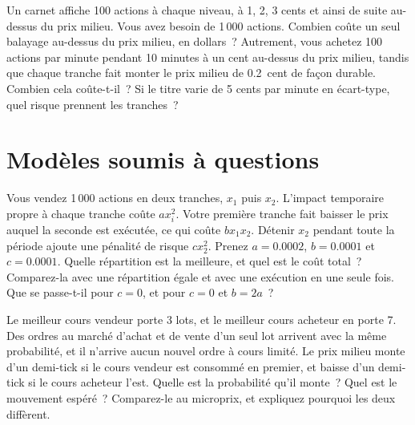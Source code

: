 \begin{question}\label{iq:iv2:markets-and-microstructure:34}
Un carnet affiche 100 actions à chaque niveau, à 1, 2, 3 cents et ainsi de suite au-dessus du prix milieu. Vous avez besoin de 1\,000 actions. Combien coûte un seul balayage au-dessus du prix milieu, en dollars~? Autrement, vous achetez 100 actions par minute pendant 10 minutes à un cent au-dessus du prix milieu, tandis que chaque tranche fait monter le prix milieu de 0.2~cent de façon durable. Combien cela coûte-t-il~? Si le titre varie de 5 cents par minute en écart-type, quel risque prennent les tranches~?
\end{question}

\section{Modèles soumis à questions}

\begin{question}\label{iq:iv2:markets-and-microstructure:35}
Vous vendez 1\,000 actions en deux tranches, $x_1$ puis $x_2$. L'impact temporaire propre à chaque tranche coûte $a x_i^2$. Votre première tranche fait baisser le prix auquel la seconde est exécutée, ce qui coûte $b x_1 x_2$. Détenir $x_2$ pendant toute la période ajoute une pénalité de risque $c x_2^2$. Prenez $a = 0.0002$, $b = 0.0001$ et $c = 0.0001$. Quelle répartition est la meilleure, et quel est le coût total~? Comparez-la avec une répartition égale et avec une exécution en une seule fois. Que se passe-t-il pour $c = 0$, et pour $c = 0$ et $b = 2a$~?
\end{question}

\begin{question}\label{iq:iv2:markets-and-microstructure:36}
Le meilleur cours vendeur porte 3 lots, et le meilleur cours acheteur en porte 7. Des ordres au marché d'achat et de vente d'un seul lot arrivent avec la même probabilité, et il n'arrive aucun nouvel ordre à cours limité. Le prix milieu monte d'un demi-tick si le cours vendeur est consommé en premier, et baisse d'un demi-tick si le cours acheteur l'est. Quelle est la probabilité qu'il monte~? Quel est le mouvement espéré~? Comparez-le au microprix, et expliquez pourquoi les deux diffèrent.
\end{question}

